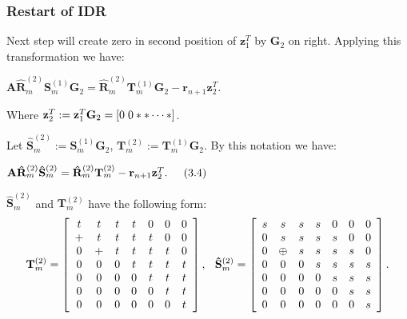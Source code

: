 \documentclass[mathserif]{beamer}
\begin{document}
\begin{frame}
\frametitle{Restart of IDR}
Next step will create zero in second position of $\mathbf{z}_1^T$ by $\mathbf{G}_2$ on right. Applying this transformation we have:
\vspace{.1in}

\hspace{.5in}$\mathbf{A} \mathbf{\hat R}_m^{(2)} \mathbf{S}_m^{(1)}\mathbf{G}_2=\mathbf{\hat R}_m^{(2)}\mathbf{T}_m^{(1)}\mathbf{G}_2-\mathbf{r}_{n+1}\mathbf{z}_2^T.$


Where $\mathbf{z}_2^T:=\mathbf{z}_1^T\mathbf{G}_2 = [0 \hspace{.04in}0 * * \cdots *]$. 
\pause
\vspace{.1in}

Let $\mathbf{\hat S}_m^{(2)}:= \mathbf{S}_m^{(1)}\mathbf{G}_2$, $\mathbf{T}_m^{(2)}:=\mathbf{T}_m^{(1)}\mathbf{G}_2$. By this notation we have:

\vspace{.1in}
\hspace{.6in} $\mathbf{A} \mathbf{\hat R}_m^{(2)} \mathbf{\hat S}_m^{(2)}=\mathbf{\hat R}_m^{(2)}\mathbf{T}_m^{(2)}-\mathbf{r}_{n+1}\mathbf{z}_2^T. \hspace{.2in} (3.4)$

\vspace{.1in}
$\mathbf{\hat S}_m^{(2)}$ and $\mathbf{T}_m^{(2)}$ have the following form:
\[
\mathbf{T}_m^{(2)}= \left[
\begin{array}{cccccccc}
t & t & t & t  & 0 & 0 & 0 \\
+ & t & t & t  & t & 0 & 0 \\
0 & +  & t  & t  & t & t & 0 \\
0 & 0  & 0  & t  & t & t & t \\
0 & 0  & 0  & 0  & t & t & t \\
0 & 0  & 0  & 0  & 0 & t & t\\
0 & 0  & 0  & 0  & 0 & 0 & t \\
\end{array}
\right], \hspace{.1in}
\mathbf{\hat S}_m^{(2)}=\left[
\begin{array}{cccccccc}
s & s & s & s  & 0 & 0 & 0 \\
0 & s & s & s  & s & 0 & 0 \\
0 & \oplus & s & s & s & s & 0 \\
0 & 0  & 0  & s & s & s & s \\
0 & 0  & 0  & 0  & s & s & s \\
0 & 0  & 0  & 0  & 0 & s & s\\
0 & 0  & 0  & 0  & 0 & 0 & s \\
\end{array}
\right].
\]
\end{frame}
\end{document}
